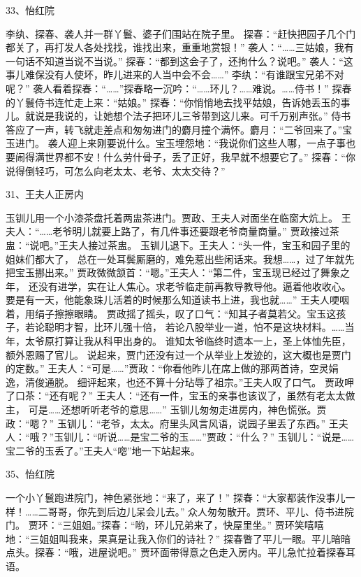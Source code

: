 33、怡红院\par
李纨、探春、袭人并一群丫鬟、婆子们围站在院子里。
探春：“赶快把园子几个门都关了，再打发人各处找找，谁找出来，重重地赏银！”
袭人：“……三姑娘，我有一句话不知道当说不当说。”
探春：“都到这会子了，还拘什么？说吧。”
袭人：“这事儿难保没有人使坏，昨儿进来的人当中会不会……”
李纨：“有谁跟宝兄弟不对呢？”
袭人看着探春：“……”探春略一沉吟：“……环儿？……难说。……侍书！”
探春的丫鬟侍书连忙走上来：“姑娘。”
探春：“你悄悄地去找平姑娘，告诉她丢玉的事儿。就说是我说的，让她想个法子把环儿三爷带到这儿来。可千万别声张。”
侍书答应了一声，转飞就走差点和匆匆进门的麝月撞个满怀。麝月：“二爷回来了。”宝玉进门。
袭人迎上来刚要说什么。宝玉埋怨地：“我说你们这些人哪，一点子事也要闹得满世界都不安！什么劳什骨子，丢了正好，我早就不想要它了。”
探春：“你说得倒轻巧，可怎么向老太太、老爷、太太交待？”

31、王夫人正房内\par
玉钏儿用一个小漆茶盘托着两盅茶进门。贾政、王夫人对面坐在临窗大炕上。
王夫人：“……老爷明儿就要上路了，有几件事还要跟老爷商量商量。”
贾政接过茶盅：“说吧。”王夫人接过茶盅。
玉钏儿退下。王夫人：“头一件，宝玉和园子里的姐妹们都大了，
总在一处耳鬓厮磨的，难免惹出些闲话来。我想……，过了年就先把宝玉挪出来。”
贾政微微颔首：“嗯。”王夫人：“第二件，宝玉现已经过了舞象之年，
还没有进学，实在让人焦心。求老爷临走前再教导教导他。逼着他收收心。
要是有一天，他能象珠儿活着的时候那么知道读书上进，我也就……”
王夫人哽咽着，用绢子擦擦眼睛。
贾政摇了摇头，叹了口气：“知其子者莫若父。宝玉这孩子，若论聪明才智，比环儿强十倍，
若论八股举业一道，怕不是这块材料。……当年，太爷原打算让我从科甲出身的。
谁知太爷临终时遗本一上，圣上体恤先臣，额外恩赐了官儿。
说起来，贾门还没有过一个从举业上发迹的，这大概也是贾门的定数。”
王夫人：“可是……”贾政：“你看他昨儿在席上做的那两首诗，空灵娟逸，清俊通脱。
细评起来，也还不算十分玷辱了祖宗。”王夫人叹了口气。
贾政呷了口茶：“还有呢？”
王夫人：“还有一件，宝玉的亲事也该议了，虽然有老太太做主，
可是……还想听听老爷的意思……”
玉钏儿匆匆走进房内，神色慌张。贾政：“嗯？”
玉钏儿：“老爷，太太。府里头风言风语，说园子里丢了东西。”
王夫人：“哦？”玉钏儿：“听说……是宝二爷的玉……”贾政：“什么？”
玉钏儿：“说是……宝二爷的玉丢了。”王夫人“唿”地一下站起来。

35、怡红院\par
一个小丫鬟跑进院门，神色紧张地：“来了，来了！”
探春：“大家都装作没事儿一样！……二哥哥，你先到后边儿呆会儿去。”
众人匆匆散开。贾环、平儿、侍书进院门。
贾环：“三姐姐。”探春：“哟，环儿兄弟来了，快屋里坐。”
贾环笑嘻嘻地：“三姐姐叫我来，果真是让我入你们的诗社？”
探春瞥了平儿一眼。平儿暗暗点头。探春：“哦，进屋说吧。”
贾环面带得意之色走入房内。平儿急忙拉着探春耳语。


